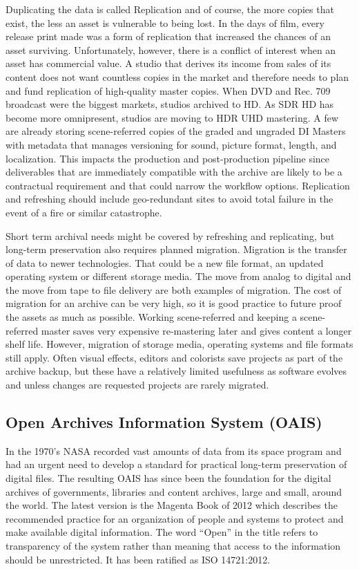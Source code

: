 Duplicating the data is called Replication and of course, the more copies that exist, the less an asset is vulnerable to being lost. In the days of film, every release print made was a form of replication that increased the chances of an asset surviving. Unfortunately, however, there is a conflict of interest when an asset has commercial value. A studio that derives its income from sales of its content does not want countless copies in the market and therefore needs to plan and fund replication of high-quality master copies. When DVD and Rec. 709 broadcast were the biggest markets, studios archived to HD. As SDR HD has become more omnipresent, studios are moving to HDR UHD mastering. A few are already storing scene-referred copies of the graded and ungraded DI Masters with metadata that manages versioning for sound, picture format, length, and localization. This impacts the production and post-production pipeline since deliverables that are immediately compatible with the archive are likely to be a contractual requirement and that could narrow the workflow options. Replication and refreshing should include geo-redundant sites to avoid total failure in the event of a fire or similar catastrophe.

Short term archival needs might be covered by refreshing and replicating, but long-term preservation also requires planned migration. Migration is the transfer of data to newer technologies. That could be a new file format, an updated operating system or different storage media.  The move from analog to digital and the move from tape to file delivery are both examples of migration. The cost of migration for an archive can be very high, so it is good practice to future proof the assets as much as possible. Working scene-referred and keeping a scene-referred master saves very expensive re-mastering later and gives content a longer shelf life. However, migration of storage media, operating systems and file formats still apply. Often visual effects, editors and colorists save projects as part of the archive backup, but these have a relatively limited usefulness as software evolves and unless changes are requested projects are rarely migrated.

\subsection{Open Archives Information System (OAIS)}

In the 1970’s NASA recorded vast amounts of data from its space program and had an urgent need to develop a standard for practical long-term preservation of digital files. The resulting OAIS has since been the foundation for the digital archives of governments, libraries and content archives, large and small, around the world. The latest version is the Magenta Book of 2012 which describes the recommended practice for an organization of people and systems to protect and make available digital information. The word “Open” in the title refers to transparency of the system rather than meaning that access to the information should be unrestricted. It has been ratified as ISO 14721:2012.

